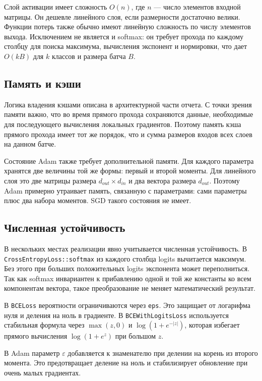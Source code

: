 \documentclass{article}
\begin{document}
Слой активации имеет сложность $O(n)$, где $n$ --- число элементов
входной матрицы. Он дешевле линейного слоя, если размерности
достаточно велики. Функции потерь также обычно имеют линейную
сложность по числу элементов выхода. Исключением не является и
softmax: он требует прохода по каждому столбцу для поиска максимума,
вычисления экспонент и нормировки, что дает $O(kB)$ для $k$ классов и
размера батча $B$.

\subsection{Память и кэши}

Логика владения кэшами описана в архитектурной части отчета. С точки
зрения памяти важно, что во время прямого прохода сохраняются данные,
необходимые для последующего вычисления локальных градиентов. Поэтому
память кэша прямого прохода имеет тот же порядок, что и сумма размеров
входов всех слоев на данном батче.

Состояние Adam также требует дополнительной памяти. Для каждого
параметра хранятся две величины той же формы: первый и второй моменты.
Для линейного слоя это две матрицы размера $d_{out} \times d_{in}$ и
два вектора размера $d_{out}$. Поэтому Adam примерно утраивает память,
связанную с параметрами: сами параметры плюс два набора моментов. SGD
такого состояния не имеет.

\subsection{Численная устойчивость}

В нескольких местах реализации явно учитывается численная
устойчивость. В \texttt{CrossEntropyLoss::softmax} из каждого столбца
logits вычитается максимум. Без этого при больших положительных logits
экспонента может переполниться. Так как softmax инвариантен к
прибавлению одной и той же константы ко всем компонентам вектора,
такое преобразование не меняет математический результат.

В \texttt{BCELoss} вероятности ограничиваются через \texttt{eps}. Это
защищает от логарифма нуля и деления на ноль в градиенте. В
\texttt{BCEWithLogitsLoss} используется стабильная формула через
$\max(z,0)$ и $\log(1+e^{-|z|})$, которая избегает прямого вычисления
$\log(1+e^z)$ при большом $z$.

В Adam параметр $\varepsilon$ добавляется к знаменателю при делении на
корень из второго момента. Это предотвращает деление на ноль и
стабилизирует обновление при очень малых градиентах.
\end{document}
